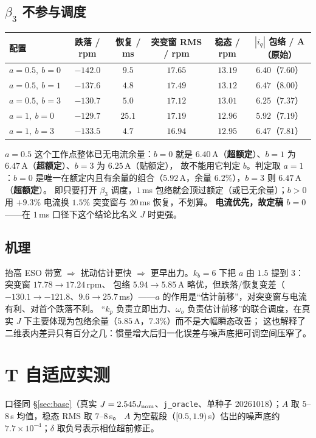 \documentclass[11pt,a4paper]{article}
\theoremstyle{remark}\newtheorem{remark}{注}
\begin{document}
\subsection{$\beta_3$ 不参与调度}\label{sec:lawd-b3}
\begin{center}\footnotesize
\begin{tabular}{@{}lccccc@{}}
\toprule
配置 & 跌落 / rpm & 恢复 / ms & 突变窗 RMS / rpm & 稳态 / rpm & $|i_q|$ 包络 / A（原始）\\
\midrule
$a{=}0.5,\ b{=}0$ & $-142.0$ & $9.5$ & $17.65$ & $13.19$ & $6.40$（$7.60$）\\
$a{=}0.5,\ b{=}1$ & $-137.6$ & $4.8$ & $17.49$ & $13.12$ & $6.47$（$8.00$）\\
$a{=}0.5,\ b{=}3$ & $-130.7$ & $5.0$ & $17.12$ & $13.01$ & $6.25$（$7.37$）\\
$a{=}1,\ b{=}0$ & $-129.7$ & $25.1$ & $17.19$ & $12.96$ & $5.92$（$7.19$）\\
$a{=}1,\ b{=}3$ & $-133.5$ & $4.7$ & $16.94$ & $12.95$ & $6.47$（$7.81$）\\
\bottomrule
\end{tabular}
\end{center}
$a{=}0.5$ 这个工作点整体已无电流余量：$b{=}0$ 就是 $6.40$\,A（\textbf{超额定}）、$b{=}1$ 为 $6.47$\,A（\textbf{超额定}）、$b{=}3$ 为 $6.25$\,A（贴额定），
故不能用它判定 $b$。判定取 $a{=}1$：$b{=}0$ 是唯一在额定内且有余量的组合（$5.92$\,A，余量 $6.2\%$），$b{=}3$ 则 $6.47$\,A（\textbf{超额定}）。
即只要打开 $\beta_3$ 调度，$1$\,ms 包络就会顶过额定（或已无余量）；$b{>}0$ 用 $+9.3\%$ 电流换 $1.5\%$ 突变窗与 $20$\,ms 恢复，不划算。
\textbf{电流优先，故定稿 $b=0$}——在 $1$\,ms 口径下这个结论比名义 $J$ 时更强。

\subsection{机理}\label{sec:lawd-mech}
抬高 ESO 带宽 $\Rightarrow$ 扰动估计更快 $\Rightarrow$ 更早出力。$k_b=6$ 下把 $a$ 由 $1.5$ 提到 $3$：突变窗 $17.78\to17.24$\,rpm、
包络 $5.94\to5.85$\,A 略优，但跌落/恢复变差（$-130.1\to-121.8$、$9.6\to25.7$\,ms）——$a$ 的作用是“估计前移”，对突变窗与电流有利、对首个跌落不利。
“$k_p$ 负责立即出力、$\omega_o$ 负责估计前移”的联合调度，在真实 $J$ 下主要体现为包络余量（$5.85$\,A，$7.3\%$）而不是大幅瞬态改善；
这也解释了二维表内差异只有百分之几：惯量增大后归一化误差与噪声底把可调空间压窄了。

\section{T 自适应实测}\label{sec:tes-res}
\noindent 口径同 §\ref{sec:base}（真实 $J=2.545J_{\rm nom}$、\texttt{j\_oracle}、单种子 20261018）；$A$ 取 $5$--$8$\,s 均值，稳态 RMS 取 $7$--$8$\,s。
$A$ 为空载段（$[0.5,1.9)$\,s）估出的噪声底约 $7.7\times10^{-4}$；$\delta$ 取负号表示相位超前修正。
\end{document}
